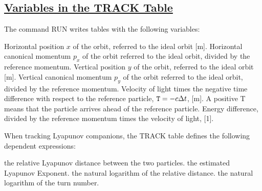 \subsection{\href{track}{Variables in the TRACK Table}} 
\label{subsec:tables_track}
The command RUN writes tables with the following variables: 
\begin{madlist}
   Horizontal position $x$ of the orbit, referred to the
  ideal orbit [m].    
   Horizontal canonical momentum $p_x$ of the orbit
  referred to the ideal orbit, divided by the reference momentum.    
   Vertical position $y$ of the orbit, referred to the
  ideal orbit [m].    
   Vertical canonical momentum $p_y$ of the orbit
  referred to the ideal orbit, divided by the reference momentum.    
   Velocity of light times the negative time difference with
  respect to the reference particle, $\hbox{\tt T}=-c\Delta t$, [m]. 
  A positive T means that the particle arrives ahead of the reference
  particle.    
   Energy difference, divided by the reference momentum times
  the velocity of light, [1].    
\end{madlist} 

When tracking Lyapunov companions, the TRACK table defines the following
dependent expressions:  
\begin{madlist}
   the relative Lyapunov distance between the two particles.    
   the estimated Lyapunov Exponent.   
   the natural logarithm of the relative distance.   
   the natural logarithm of the turn number.   
\end{madlist}





